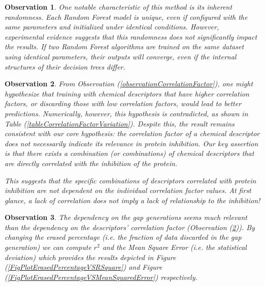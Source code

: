 \documentclass[12pt,letterpaper]{article}
\newtheorem{observation}{Observation}
\begin{document}
\begin{multicols}{2}
\begin{observation}
One notable characteristic of this method is its inherent randomness. Each Random Forest model is unique, even if configured with the same parameters and initialized under identical conditions. However, experimental evidence suggests that this randomness does not significantly impact the results. If two Random Forest algorithms are trained on the same dataset using identical parameters, their outputs will converge, even if the internal structures of their decision trees differ.
\end{observation}

\begin{observation}\label{ObsDescriptorsCorrelationFactor}
From Observation (\ref{observationCorrelationFactor}), one might hypothesize that training with chemical descriptors that have higher correlation factors, or discarding those with low correlation factors, would lead to better predictions. Numerically, however, this hypothesis is contradicted, as shown in Table (\ref{tableCorrelationFactorVariation}). Despite this, the result remains consistent with our core hypothesis: the correlation factor of a chemical descriptor does not necessarily indicate its relevance in protein inhibition. Our key assertion is that \emph{there exists a combination (or combinations) of chemical descriptors that are directly correlated with the inhibition of the protein}. \par

This suggests that the specific combinations of descriptors correlated with protein inhibition are not dependent on the individual correlation factor values. At first glance, a lack of correlation does not imply a lack of relationship to the inhibition!

\end{observation}

\begin{observation}
The dependency on the gap generations seems much relevant than the dependency on the descriptors' correlation factor (Observation (\ref{ObsDescriptorsCorrelationFactor})). By changing the erased percentage (i.e. the fraction of data discarded in the gap generation) we can compute $r^2$ and the Mean Square Error (i.e. the statistical deviation) which provides the results depicted in Figure (\ref{FigPlotErasedPercentageVSRSquare}) and Figure (\ref{FigPlotErasedPercentageVSMeanSquaredError}) respectively.  
\end{observation}




\end{multicols}
\end{document}
